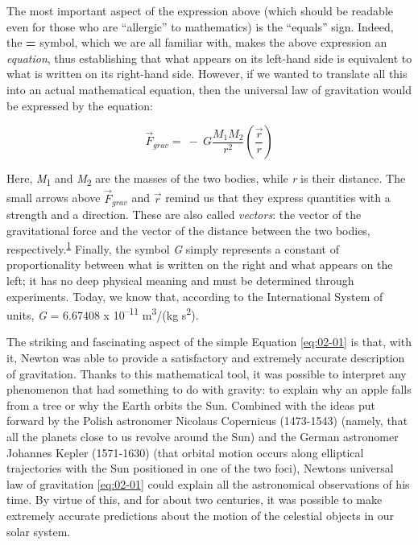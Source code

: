 The most important aspect of the expression above (which should be readable even for
those who are ``allergic'' to mathematics) is the ``equals'' sign. Indeed, the
\textbf{=} symbol, which we are all familiar with, makes the above expression an
\emph{equation}, thus establishing that what appears on its left-hand side is equivalent
to what is written on its right-hand side. However, if we wanted to translate all this
into an actual mathematical equation, then the universal law of gravitation would be
expressed by the equation:

\begin{equation}\label{eq:02-01}
{\overrightarrow{F}}_{grav} = \  - \ G\frac{M_{1}M_{2}}{r^{2}}\left( \frac{\overrightarrow{r}}{r} \right)
\end{equation}

Here, \emph{M}\textsubscript{1} and \emph{M}\textsubscript{2} are the masses of the two
bodies, while \emph{r} is their distance. The small arrows above
\({\overrightarrow{F}}_{grav}\) and \(\overrightarrow{r}\) remind us that they express
quantities with a strength and a direction. These are also called \emph{vectors}: the
vector of the gravitational force and the
vector of the distance between the two bodies,
respectively.\textsuperscript{\hyperlink{note:02-01}{1}} Finally, the symbol \emph{G}
simply represents a constant of proportionality between what is written on the right and
what appears on the left; it has no deep physical meaning and must be determined through
experiments. Today, we know that, according to the International System of units,
\emph{G} = 6.67408 x 10\textsuperscript{--11} m\textsuperscript{3}/(kg
s\textsuperscript{2}).

The striking and fascinating aspect of the simple Equation \eqref{eq:02-01} is that, with it,
Newton was able to provide a satisfactory and extremely accurate description of
gravitation. Thanks to this mathematical tool, it was possible to interpret any
phenomenon that had something to do with gravity: to explain why an apple falls from a
tree or why the Earth orbits the Sun. Combined with the ideas put forward by the Polish
astronomer Nicolaus Copernicus (1473-1543) (namely, that all
the planets close to us revolve around the Sun) and the German astronomer Johannes
Kepler (1571-1630) (that orbital motion occurs along
elliptical trajectories with the Sun positioned in one of the two foci),
Newton\textquotesingle s universal law of gravitation \eqref{eq:02-01} could explain all the
astronomical observations of his time. By virtue of this, and for about two centuries,
it was possible to make extremely accurate predictions about the motion of the celestial
objects in our solar system.

